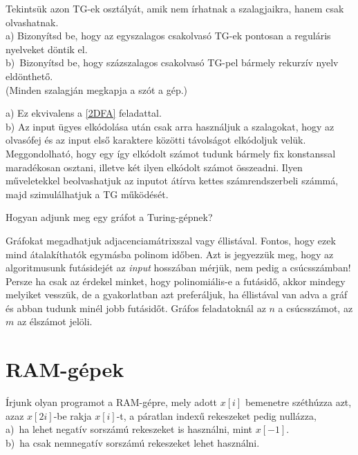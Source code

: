 \begin{Exercise}[counter={sorszam}, difficulty=0]\label{csakolvaso}
	Tekintsük azon TG-ek osztályát, amik nem írhatnak a szalagjaikra, hanem csak olvashatnak.\\
	a) Bizonyítsd be, hogy az egyszalagos csakolvasó TG-ek pontosan a reguláris nyelveket döntik el.\\
	b)~\hard Bizonyítsd be, hogy százszalagos csakolvasó TG-pel bármely rekurzív nyelv eldönthet\H o.\\
	(Minden szalagján megkapja a szót a gép.)
\end{Exercise}	
\begin{Answer}
	a) Ez ekvivalens a \ref{2DFA} feladattal.\\
	b) Az input \"ugyes elk\'odol\'asa ut\'an csak arra haszn\'aljuk a szalagokat, hogy az olvas\'ofej \'es az input els\H o karaktere k\"oz\"otti t\'avols\'agot elk\'odoljuk vel\"uk.
	Meggondolhat\'o, hogy egy \'igy elk\'odolt sz\'amot tudunk b\'armely fix konstanssal marad\'ekosan osztani, illetve k\'et ilyen elk\'odolt sz\'amot \"osszeadni.
	Ilyen m\H uveletekkel beolvashatjuk az inputot \'at\'irva kettes sz\'amrendszerbeli sz\'amm\'a, majd szimul\'alhatjuk a TG m\H uk\"od\'es\'et.
\end{Answer}

\begin{Exercise}[counter={sorszam}, difficulty=0]
	Hogyan adjunk meg egy gr\'afot a Turing-g\'epnek?
\end{Exercise}	
\begin{Answer}
	Gr\'afokat megadhatjuk adjacenciam\'atrixszal vagy \'ellist\'aval. Fontos, hogy ezek mind \'atalak\'ithat\'ok egym\'asba polinom id\H oben. Azt is jegyezz\"uk meg, hogy az algoritmusunk fut\'asidej\'et az \emph{input} hossz\'aban m\'erj\"uk, nem pedig a cs\'ucssz\'amban! Persze ha csak az \'erdekel minket, hogy polinomi\'alis-e a fut\'asid\H o, akkor mindegy melyiket vessz\"uk, de a gyakorlatban azt prefer\'aljuk, ha \'ellist\'aval van adva a gr\'af \'es abban tudunk min\'el jobb fut\'asid\H ot. Gr\'afos feladatokn\'al az $n$ a cs\'ucssz\'amot, az $m$ az \'elsz\'amot jel\"oli.
\end{Answer}

\section{RAM-g\'epek}

\begin{Exercise}[counter={sorszam}, difficulty=0]
	Írjunk olyan programot a RAM-gépre, mely adott $x[i]$ bemenetre sz\'eth\'uzza azt, azaz $x[2i]$-be rakja $x[i]$-t, a p\'aratlan index\H u rekeszeket pedig null\'azza,\\
	a)~ha lehet negat\'iv sorsz\'am\'u rekeszeket is haszn\'alni, mint $x[-1]$.\\
	b)~ha csak nemnegat\'iv sorsz\'am\'u rekeszeket lehet haszn\'alni.	
\end{Exercise}		 

